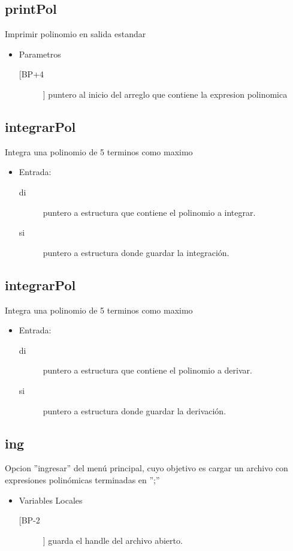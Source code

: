\subsection{printPol}
\label{sec-5-10}
Imprimir polinomio en salida estandar
\begin{itemize}
\item Parametros
\begin{description}
\item[[BP+4]] puntero al inicio del arreglo que contiene la
expresion polinomica
\end{description}
\end{itemize}

\subsection{integrarPol}
\label{sec-5-11}
Integra una polinomio de 5 terminos como maximo
\begin{itemize}
\item Entrada:
\begin{description}
\item[di] puntero a estructura que contiene el polinomio a
integrar.
\item[si] puntero a estructura donde guardar la integración.
\end{description}
\end{itemize}

\subsection{integrarPol}
\label{sec-5-12}
Integra una polinomio de 5 terminos como maximo
\begin{itemize}
\item Entrada:
\begin{description}
\item[di] puntero a estructura que contiene el polinomio a
derivar.
\item[si] puntero a estructura donde guardar la derivación.
\end{description}
\end{itemize}


\subsection{ing}
\label{sec-5-13}
Opcion ''ingresar'' del menú principal, cuyo objetivo es
cargar un archivo con expresiones polinómicas terminadas en
'';''
\begin{itemize}
\item Variables Locales
\begin{description}
\item[[BP-2]] guarda el handle del archivo abierto.
\end{description}
\end{itemize}


